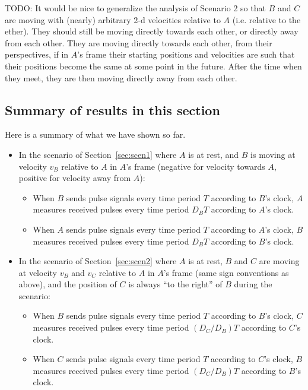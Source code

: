 \documentclass[a4paper]{article}
\theoremstyle{plain}
\theoremstyle{definition}
\begin{document}
TODO: It would be nice to generalize the analysis of Scenario 2 so
that $B$ and $C$ are moving with (nearly) arbitrary 2-d velocities
relative to $A$ (i.e. relative to the ether).  They should still be
moving directly towards each other, or directly away from each other.
They are moving directly towards each other, from their perspectives,
if in $A$'s frame their starting positions and velocities are such
that their positions become the same at some point in the future.
After the time when they meet, they are then moving directly away from
each other.


\subsection{Summary of results in this section}
\label{sec:summary}

Here is a summary of what we have shown so far.

\begin{itemize}
\item In the scenario of Section~\ref{sec:scen1} where $A$ is at rest,
  and $B$ is moving at velocity $v_B$ relative to $A$ in $A$'s frame
  (negative for velocity towards $A$, positive for velocity away from
  $A$):
  \begin{itemize}
    \item When $B$ sends pulse signals every time period $T$ according
      to $B$'s clock, $A$ measures received pulses every time period
      $D_B T$ according to $A$'s clock.
    \item When $A$ sends pulse signals every time period $T$ according
      to $A$'s clock, $B$ measures received pulses every time period
      $D_B T$ according to $B$'s clock.
  \end{itemize}
\item In the scenario of Section~\ref{sec:scen2} where $A$ is at rest,
  $B$ and $C$ are moving at velocity $v_B$ and $v_C$ relative to $A$
  in $A$'s frame (same sign conventions as above), and the position of
  $C$ is always ``to the right'' of $B$ during the scenario:
  \begin{itemize}
    \item When $B$ sends pulse signals every time period $T$ according
      to $B$'s clock, $C$ measures received pulses every time period
      $(D_C/D_B) T$ according to $C$'s clock.
    \item When $C$ sends pulse signals every time period $T$ according
      to $C$'s clock, $B$ measures received pulses every time period
      $(D_C/D_B) T$ according to $B$'s clock.
  \end{itemize}
\end{itemize}
\end{document}
